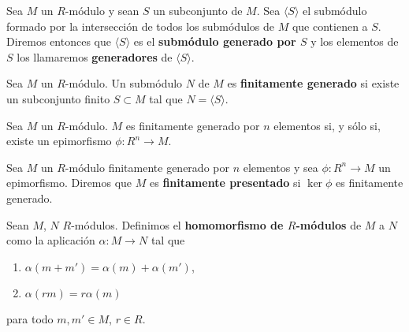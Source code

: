 \begin{definicion}
	Sea \(M\) un \(R\)-módulo y sean \(S\) un subconjunto de \(M\). Sea
	\(\langle S \rangle\) el submódulo formado por la intersección de todos los
	submódulos de \(M\) que contienen a \(S\). Diremos entonces que \(\langle S \rangle\)
	es el \textbf{submódulo generado por \(S\)} y los elementos de $S$ los llamaremos \textbf{generadores} de \(\langle S \rangle\).
\end{definicion}

\begin{definicion}
	Sea \(M\) un \(R\)-módulo. Un submódulo \(N\) de \(M\) es \textbf{finitamente generado}
	si existe un subconjunto finito \(S \subset M\) tal que \(N = \langle S \rangle\).
\end{definicion}

\begin{lema}
	Sea \( M \) un \( R \)-módulo. \( M \) es finitamente generado por \( n \) elementos si, y sólo si, existe un epimorfismo \( \phi : R^n \to M \).
\end{lema}
%	

\begin{definicion}
	Sea \( M \) un \( R \)-módulo finitamente generado por \( n \) elementos y sea \( \phi : R^n \to M \) un epimorfismo. Diremos que \( M \) es \textbf{finitamente presentado} si \( \ker \phi \) es finitamente generado.
\end{definicion}

\begin{definicion}
	Sean \(M\), \(N\) \(R\)-módulos. Definimos el \textbf{homomorfismo de \(R\)-módulos}
	de \(M\) a \(N\) como la aplicación \(\alpha: M \rightarrow N\) tal que
	\begin{enumerate}
		\item \(\alpha(m+m') = \alpha(m) + \alpha(m')\),
		
		\item \(\alpha(rm) = r\alpha(m)\)
	\end{enumerate}
	para todo \(m,m' \in M\), \(r \in R\).
\end{definicion}

